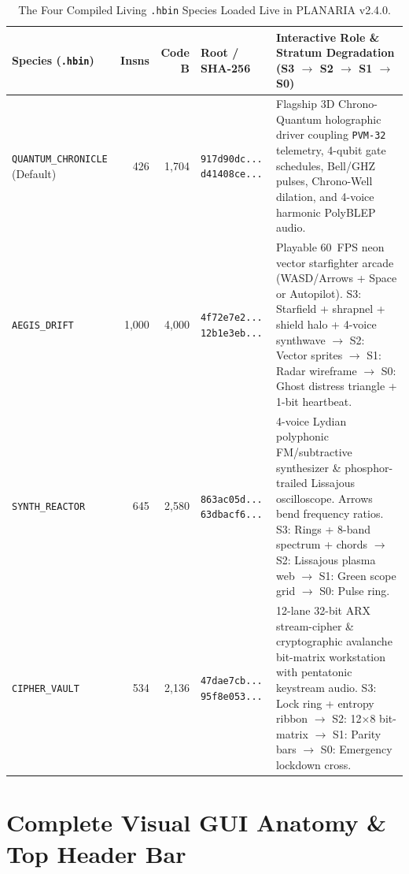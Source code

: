 \documentclass[10pt,letterpaper]{article}
\begin{document}
\begin{table}[ht]
\centering
\caption{The Four Compiled Living \texttt{.hbin} Species Loaded Live in PLANARIA v2.4.0.}
\label{tab:species}
\footnotesize
\begin{tabularx}{\textwidth}{@{} L{3.0cm} r r L{2.4cm} Y @{}}
\toprule
\textbf{Species (\texttt{.hbin})} & \textbf{Insns} & \textbf{Code B} & \textbf{Root / SHA-256} & \textbf{Interactive Role \& Stratum Degradation (S3 $\to$ S2 $\to$ S1 $\to$ S0)} \\
\midrule
\texttt{QUANTUM\_CHRONICLE} (Default) & 426 & 1,704 & \texttt{917d90dc...} \texttt{d41408ce...} & Flagship 3D Chrono-Quantum holographic driver coupling \texttt{PVM-32} telemetry, 4-qubit gate schedules, Bell/GHZ pulses, Chrono-Well dilation, and 4-voice harmonic PolyBLEP audio. \\
\texttt{AEGIS\_DRIFT} & 1,000 & 4,000 & \texttt{4f72e7e2...} \texttt{12b1e3eb...} & Playable 60~FPS neon vector starfighter arcade (WASD/Arrows + Space or Autopilot). S3: Starfield + shrapnel + shield halo + 4-voice synthwave $\to$ S2: Vector sprites $\to$ S1: Radar wireframe $\to$ S0: Ghost distress triangle + 1-bit heartbeat. \\
\texttt{SYNTH\_REACTOR} & 645 & 2,580 & \texttt{863ac05d...} \texttt{63dbacf6...} & 4-voice Lydian polyphonic FM/subtractive synthesizer \& phosphor-trailed Lissajous oscilloscope. Arrows bend frequency ratios. S3: Rings + 8-band spectrum + chords $\to$ S2: Lissajous plasma web $\to$ S1: Green scope grid $\to$ S0: Pulse ring. \\
\texttt{CIPHER\_VAULT} & 534 & 2,136 & \texttt{47dae7cb...} \texttt{95f8e053...} & 12-lane 32-bit ARX stream-cipher \& cryptographic avalanche bit-matrix workstation with pentatonic keystream audio. S3: Lock ring + entropy ribbon $\to$ S2: 12$\times$8 bit-matrix $\to$ S1: Parity bars $\to$ S0: Emergency lockdown cross. \\
\bottomrule
\end{tabularx}
\end{table}

\clearpage
\section{Complete Visual GUI Anatomy \& Top Header Bar}
\label{sec:gui-anatomy}
\end{document}
